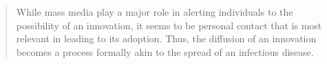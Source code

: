   \begin{quote}
    While mass media play a major role in alerting individuals to the
    possibility of an innovation, it seems to be personal contact that is
    most relevant in leading to its adoption. Thus, the diffusion of an
    innovation becomes a process formally akin to the spread of an
    infectious disease.
  \end{quote}
